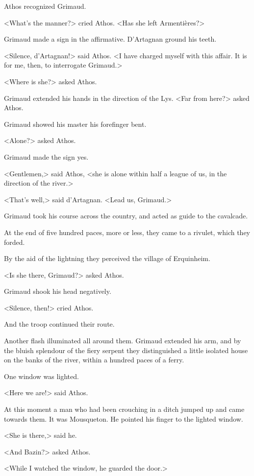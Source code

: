 Athos recognized Grimaud. 

<What's the manner?> cried Athos. <Has she left Armentières?> 

Grimaud made a sign in the affirmative. D'Artagnan ground his teeth. 

<Silence, d'Artagnan!> said Athos. <I have charged myself with this affair. It is for me, then, to interrogate Grimaud.> 

<Where is she?> asked Athos. 

Grimaud extended his hands in the direction of the Lys. <Far from here?> asked Athos. 

Grimaud showed his master his forefinger bent. 

<Alone?> asked Athos. 

Grimaud made the sign yes. 

<Gentlemen,> said Athos, <she is alone within half a league of us, in the direction of the river.> 

<That's well,> said d'Artagnan. <Lead us, Grimaud.> 

Grimaud took his course across the country, and acted as guide to the cavalcade. 

At the end of five hundred paces, more or less, they came to a rivulet, which they forded. 

By the aid of the lightning they perceived the village of Erquinheim. 

<Is she there, Grimaud?> asked Athos. 

Grimaud shook his head negatively. 

<Silence, then!> cried Athos. 

And the troop continued their route. 

Another flash illuminated all around them. Grimaud extended his arm, and by the bluish splendour of the fiery serpent they distinguished a little isolated house on the banks of the river, within a hundred paces of a ferry. 

One window was lighted. 

<Here we are!> said Athos. 

At this moment a man who had been crouching in a ditch jumped up and came towards them. It was Mousqueton. He pointed his finger to the lighted window. 

<She is there,> said he. 

<And Bazin?> asked Athos. 

<While I watched the window, he guarded the door.> 

